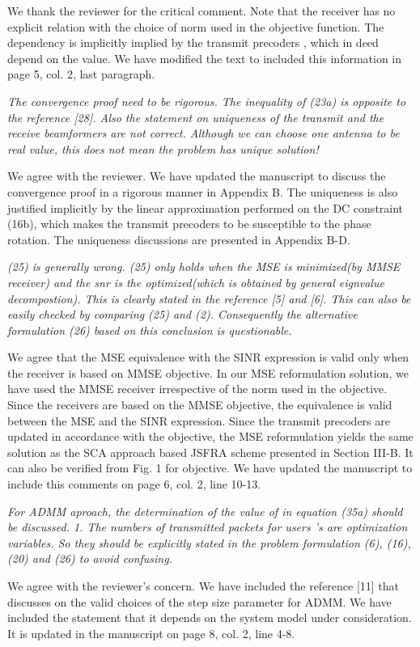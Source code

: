\begin{itemize}
\resp We thank the reviewer for the critical comment. Note that the receiver has no explicit relation with the choice of  norm used in the objective function. The dependency is implicitly implied by the transmit precoders , which in deed depend on the  value. We have modified the text to included this information in page 5, col. 2, last paragraph.

 \textit{The convergence proof need to be rigorous. The inequality of (23a) is opposite to the reference [28]. Also the statement on uniqueness of the transmit and the receive beamformers are not correct. Although we can choose one antenna to be real value, this does not mean the problem has unique solution!}

\resp We agree with the reviewer. We have updated the manuscript to discuss the convergence proof in a rigorous manner in Appendix B. The uniqueness is also justified implicitly by the linear approximation performed on the DC constraint (16b), which makes the transmit precoders to be susceptible to the phase rotation. The uniqueness discussions are presented in Appendix B-D.

 \textit{(25) is generally wrong. (25) only holds when the MSE is minimized(by MMSE receiver) and the snr is the optimized(which is obtained by general eignvalue decompostion). This is clearly stated in the reference [5] and [6]. This can also be easily checked by comparing (25) and (2). Consequently the alternative formulation (26) based on this conclusion is questionable.}

\resp We agree that the MSE equivalence with the SINR expression is valid only when the receiver is based on MMSE objective. In our MSE reformulation solution, we have used the MMSE receiver irrespective of the  norm used in the objective. Since the receivers are based on the MMSE objective, the equivalence is valid between the MSE and the SINR expression. Since the transmit precoders are updated in accordance with the objective, the MSE reformulation yields the same solution as the SCA approach based JSFRA scheme presented in Section III-B. It can also be verified from Fig. 1 for  objective. We have updated the manuscript to include this comments on page 6, col. 2, line 10-13.

 \textit{For ADMM aproach, the determination of the value of \me{\rho} in equation (35a) should be discussed. 1. The numbers of transmitted packets for users  's are optimization variables. So they should be explicitly stated in the problem formulation (6), (16), (20) and (26) to avoid confusing.}

\resp We agree with the reviewer's concern. We have included the reference [11] that discusses on the valid choices of the step size parameter for ADMM. We have included the statement that it depends on the system model under consideration. It is updated in the manuscript on page 8, col. 2, line 4-8.

\end{itemize}

